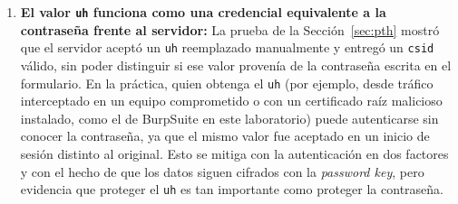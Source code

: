 \documentclass[letter,12pt]{article}
\begin{document}
\begin{enumerate}
    \item \textbf{El valor \texttt{uh} funciona como una credencial equivalente a la contraseña frente al servidor:} La prueba de la Sección~\ref{sec:pth} mostró que el servidor aceptó un \texttt{uh} reemplazado manualmente y entregó un \texttt{csid} válido, sin poder distinguir si ese valor provenía de la contraseña escrita en el formulario. En la práctica, quien obtenga el \texttt{uh} (por ejemplo, desde tráfico interceptado en un equipo comprometido o con un certificado raíz malicioso instalado, como el de BurpSuite en este laboratorio) puede autenticarse sin conocer la contraseña, ya que el mismo valor fue aceptado en un inicio de sesión distinto al original. Esto se mitiga con la autenticación en dos factores y con el hecho de que los datos siguen cifrados con la \textit{password key}, pero evidencia que proteger el \texttt{uh} es tan importante como proteger la contraseña.

\end{enumerate}
\end{document}
